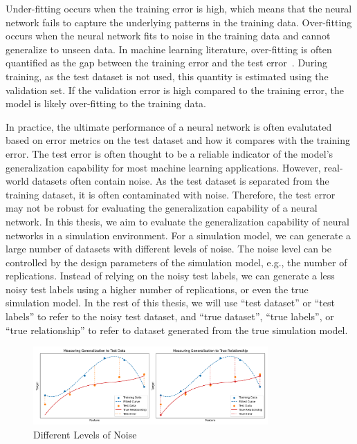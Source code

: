 Under-fitting occurs when the training error is high, which means that the neural network fails to capture the underlying patterns in the training data.
Over-fitting occurs when the neural network fits to noise in the training data and cannot generalize to unseen data.
In machine learning literature, over-fitting is often quantified as the gap between the training error and the test error~\citep{bishop2006pattern}.
During training, as the test dataset is not used, this quantity is estimated using the validation set.
If the validation error is high compared to the training error, the model is likely over-fitting to the training data.

In practice, the ultimate performance of a neural network is often evalutated based on error metrics on the test dataset and how it compares with the training error. 
The test error is often thought to be a reliable indicator of the model's generalization capability for most machine learning applications.
However, real-world datasets often contain noise.
As the test dataset is separated from the training dataset, it is often contaminated with noise.
Therefore, the test error may not be robust for evaluating the generalization capability of a neural network.
In this thesis, we aim to evaluate the generalization capability of neural networks in a simulation environment.
For a simulation model, we can generate a large number of datasets with different levels of noise.
The noise level can be controlled by the design parameters of the simulation model, e.g., the number of replications.
Instead of relying on the noisy test labels, we can generate a less noisy test labels using a higher number of replications, or even the true simulation model.
In the rest of this thesis, we will use ``test dataset'' or ``test labels'' to refer to the noisy test dataset, and ``true dataset'', ``true labels'', or ``true relationship'' to refer to dataset generated from the true simulation model.

\begin{figure}[ht!] 
    \centering
    \includegraphics[width=0.8\textwidth]{./project2/figures/datasets.png}
    \caption{Different Levels of Noise}
    \label{fig:datasets}
\end{figure}

